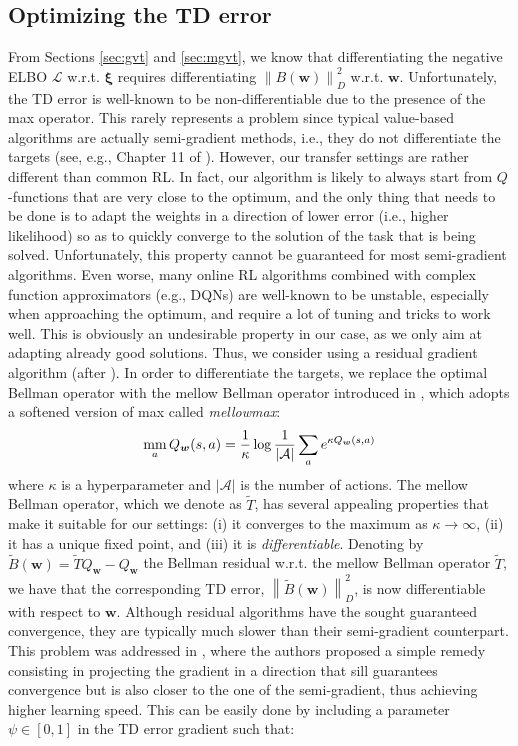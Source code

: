 \documentclass{article}
\newcommand{\mm}{\operatornamewithlimits{mm}}
\newcommand{\wt}[1]{\widetilde{#1}}
\newcommand{\norm}[1]{\left\lVert #1 \right\rVert}
\begin{document}
\subsection{Optimizing the TD error} \label{sec:td}

From Sections \ref{sec:gvt} and \ref{sec:mgvt}, we know that differentiating the negative ELBO $\mathcal{L}$ w.r.t. $\bm{\xi}$ requires differentiating $\norm{B(\bm{w})}_D^2$ w.r.t. $\bm{w}$. Unfortunately, the TD error is well-known to be non-differentiable due to the presence of the max operator. This rarely represents a problem since typical value-based algorithms are actually semi-gradient methods, i.e., they do not differentiate the targets (see, e.g., Chapter 11 of \cite{}). However, our transfer settings are rather different than common RL. In fact, our algorithm is likely to always start from $Q$-functions that are very close to the optimum, and the only thing that needs to be done is to adapt the weights in a direction of lower error (i.e., higher likelihood) so as to quickly converge to the solution of the task that is being solved. Unfortunately, this property cannot be guaranteed for most semi-gradient algorithms. Even worse, many online RL algorithms combined with complex function approximators (e.g., DQNs) are well-known to be unstable, especially when approaching the optimum, and require a lot of tuning and tricks to work well. This is obviously an undesirable property in our case, as we only aim at adapting already good solutions. Thus, we consider using a residual gradient algorithm (after \cite{}). In order to differentiate the targets, we replace the optimal Bellman operator with the mellow Bellman operator introduced in \cite{}, which adopts a softened version of max called \textit{mellowmax}:
\begin{equation}
\mm_a Q_{\bm{w}}(s,a) = \frac{1}{\kappa} \log \frac{1}{|\mathcal{A}|}\sum_a e^{\kappa Q_{\bm{w}}(s,a)}
\end{equation}
where $\kappa$ is a hyperparameter and $|\mathcal{A}|$ is the number of actions. The mellow Bellman operator, which we denote as $\wt{T}$, has several appealing properties that make it suitable for our settings: (i) it converges to the maximum as $\kappa \rightarrow \infty$, (ii) it has a unique fixed point, and (iii) it is \textit{differentiable}. Denoting by $\wt{B}(\bm{w}) = \wt{T}Q_{\bm{w}} - Q_{\bm{w}}$ the Bellman residual w.r.t. the mellow Bellman operator $\wt{T}$, we have that the corresponding TD error, $\norm{\wt{B}(\bm{w})}_D^2$, is now differentiable with respect to $\bm{w}$. Although residual algorithms have the sought guaranteed convergence, they are typically much slower than their semi-gradient counterpart. This problem was addressed in \cite{}, where the authors proposed a simple remedy consisting in projecting the gradient in a direction that sill guarantees convergence but is also closer to the one of the semi-gradient, thus achieving higher learning speed. This can be easily done by including a parameter $\psi\in[0,1]$ in the TD error gradient such that:
\end{document}
